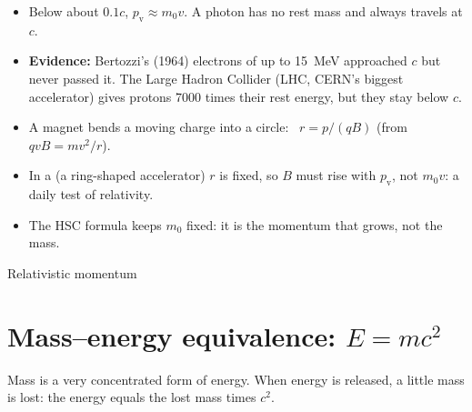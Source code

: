 \begin{itemize}
  \item Below about $0.1c$, $p_\mathrm{v} \approx m_0v$. A photon has no rest mass and always
        travels at $c$.
  \item \textbf{Evidence:} Bertozzi's (1964) electrons of up to \qty{15}{\mega\eV} approached $c$
        but never passed it. The Large Hadron Collider (LHC, CERN's biggest accelerator) gives
        protons 7000 times their rest energy, but they stay below $c$.
  \item A magnet bends a moving charge into a circle: \hscbadgenotonsheet\ $r = p/(qB)$
        (from $qvB = mv^2/r$).
  \item In a  (a ring-shaped accelerator) $r$ is fixed, so $B$ must rise
        with $p_\mathrm{v}$, not $m_0v$: a daily test of relativity.
  \item The HSC formula keeps $m_0$ fixed: it is the momentum that grows, not the mass.
\end{itemize}

\begin{formulacard}{Relativistic momentum}
  \begin{symbols}
  \end{symbols}
\end{formulacard}

\section{Mass--energy equivalence: \texorpdfstring{$E = mc^2$}{E = mc2}}\label{ch4:sec:emc2}

\begin{bigidea}
Mass is a very concentrated form of energy. When energy is released, a little mass is lost:
the energy equals the lost mass times $c^2$.
\end{bigidea}

\begin{keywords}
\end{keywords}

